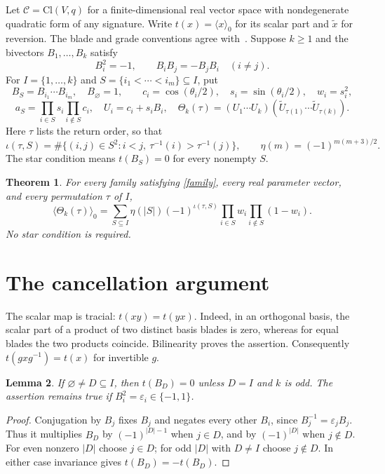 \documentclass[11pt]{article}
\newtheorem{theorem}{Theorem}
\newtheorem{lemma}[theorem]{Lemma}
\newcommand{\scal}[1]{\langle #1\rangle_0}
\newcommand{\inv}{\iota}
\begin{document}
Let $\mathcal C=\mathrm{Cl}(V,q)$ for a finite-dimensional real vector space
with nondegenerate quadratic form of any signature. Write
$t(x)=\scal{x}$ for its scalar part and $\widetilde x$ for reversion.
The blade and grade conventions agree with~\cite[Section 2.3]{LS}.
Suppose $k\geq1$ and the bivectors $B_1,\ldots,B_k$ satisfy
\begin{equation}\label{family}
B_i^2=-1,\qquad B_iB_j=-B_jB_i\quad(i\ne j).
\end{equation}
For $I=\{1,\ldots,k\}$ and $S=\{i_1<\cdots<i_m\}\subseteq I$, put
\[
B_S=B_{i_1}\cdots B_{i_m},\quad B_\varnothing=1,\qquad
c_i=\cos(\theta_i/2),\quad s_i=\sin(\theta_i/2),\quad w_i=s_i^2,
\]
\[
a_S=\prod_{i\in S}s_i\prod_{i\notin S}c_i,\quad
U_i=c_i+s_iB_i,\quad
\Theta_k(\tau)=(U_1\cdots U_k)
(\widetilde U_{\tau(1)}\cdots\widetilde U_{\tau(k)}).
\]
Here $\tau$ lists the return order, so that
\[
\inv(\tau,S)=\#\{(i,j)\in S^2:i<j,\ \tau^{-1}(i)>\tau^{-1}(j)\},
\qquad \eta(m)=(-1)^{m(m+3)/2}.
\]
The star condition means $t(B_S)=0$ for every nonempty $S$.

\begin{theorem}\label{main}
For every family satisfying \eqref{family}, every real parameter vector,
and every permutation $\tau$ of $I$,
\begin{equation}\label{formula}
\scal{\Theta_k(\tau)}=
\sum_{S\subseteq I}\eta(|S|)(-1)^{\inv(\tau,S)}
\prod_{i\in S}w_i\prod_{i\notin S}(1-w_i).
\end{equation}
No star condition is required.
\end{theorem}

\section{The cancellation argument}
The scalar map is tracial: $t(xy)=t(yx)$. Indeed, in an orthogonal basis,
the scalar part of a product of two distinct basis blades is zero, whereas
for equal blades the two products coincide. Bilinearity proves the assertion.
Consequently $t(gxg^{-1})=t(x)$ for invertible $g$.

\begin{lemma}\label{trace}
If $\varnothing\ne D\subseteq I$, then $t(B_D)=0$ unless $D=I$ and $k$
is odd. The assertion remains true if $B_i^2=\varepsilon_i\in\{-1,1\}$.
\end{lemma}
\begin{proof}
Conjugation by $B_j$ fixes $B_j$ and negates every other $B_i$, since
$B_j^{-1}=\varepsilon_jB_j$. Thus it multiplies $B_D$ by
$(-1)^{|D|-1}$ when $j\in D$, and by $(-1)^{|D|}$ when $j\notin D$.
For even nonzero $|D|$ choose $j\in D$; for odd $|D|$ with $D\ne I$
choose $j\notin D$. In either case invariance gives $t(B_D)=-t(B_D)$.
\end{proof}
\end{document}
